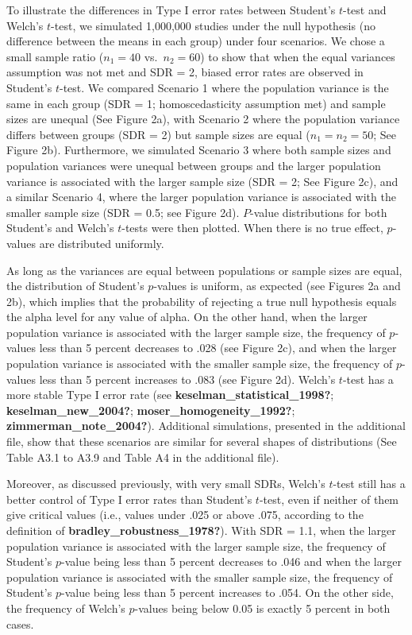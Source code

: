 \documentclass[
  english,
  man]{apa6}
\begin{document}
To illustrate the differences in Type I error rates between Student's \(t\)-test and Welch's \(t\)-test, we simulated 1,000,000 studies under the null hypothesis (no difference between the means in each group) under four scenarios. We chose a small sample ratio (\(n_1 = 40\) vs.~\(n_2 = 60\)) to show that when the equal variances assumption was not met and SDR = 2, biased error rates are observed in Student's \(t\)-test. We compared Scenario 1 where the population variance is the same in each group (SDR = 1; homoscedasticity assumption met) and sample sizes are unequal (See Figure 2a), with Scenario 2 where the population variance differs between groups (SDR = 2) but sample sizes are equal (\(n_1 = n_2 = 50\); See Figure 2b). Furthermore, we simulated Scenario 3 where both sample sizes and population variances were unequal between groups and the larger population variance is associated with the larger sample size (SDR = 2; See Figure 2c), and a similar Scenario 4, where the larger population variance is associated with the smaller sample size (SDR = 0.5; see Figure 2d). \(P\)-value distributions for both Student's and Welch's \(t\)-tests were then plotted. When there is no true effect, \(p\)-values are distributed uniformly.

As long as the variances are equal between populations or sample sizes are equal, the distribution of Student's \(p\)-values is uniform, as expected (see Figures 2a and 2b), which implies that the probability of rejecting a true null hypothesis equals the alpha level for any value of alpha. On the other hand, when the larger population variance is associated with the larger sample size, the frequency of \(p\)-values less than 5 percent decreases to .028 (see Figure 2c), and when the larger population variance is associated with the smaller sample size, the frequency of \(p\)-values less than 5 percent increases to .083 (see Figure 2d). Welch's \(t\)-test has a more stable Type I error rate (see \textbf{keselman\_statistical\_1998?}; \textbf{keselman\_new\_2004?}; \textbf{moser\_homogeneity\_1992?}; \textbf{zimmerman\_note\_2004?}). Additional simulations, presented in the additional file, show that these scenarios are similar for several shapes of distributions (See Table A3.1 to A3.9 and Table A4 in the additional file).

Moreover, as discussed previously, with very small SDRs, Welch's \(t\)-test still has a better control of Type I error rates than Student's \(t\)-test, even if neither of them give critical values (i.e., values under .025 or above .075, according to the definition of \textbf{bradley\_robustness\_1978?}). With SDR = 1.1, when the larger population variance is associated with the larger sample size, the frequency of Student's \(p\)-value being less than 5 percent decreases to .046 and when the larger population variance is associated with the smaller sample size, the frequency of Student's \(p\)-value being less than 5 percent increases to .054. On the other side, the frequency of Welch's \(p\)-values being below 0.05 is exactly 5 percent in both cases.
\end{document}
